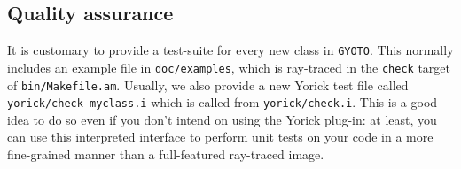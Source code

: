 \documentclass[a4paper,12pt]{article}
\providecommand{\GyotoSrcDir}{../..}
\newcommand{\GYOTO}{\texttt{GYOTO}}
\begin{document}
\subsection{Quality assurance}

It is customary to provide a test-suite for every new class in
\GYOTO. This normally includes an example file in
\texttt{doc/examples}, which is ray-traced in the \texttt{check}
target of \texttt{bin/Makefile.am}. Usually, we also provide a new
Yorick test file called\\
\texttt{yorick/check-myclass.i} which is
called from \texttt{yorick/check.i}. This is a good idea to do so even
if you don't intend on using the Yorick plug-in: at least, you can use
this interpreted interface to perform unit tests on your code in a
more fine-grained manner than a full-featured ray-traced image.



\end{document}
